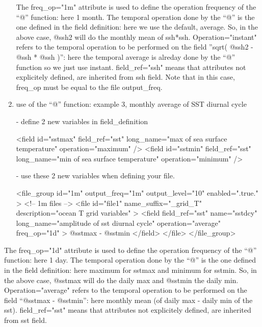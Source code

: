 \documentclass[../main/NEMO_manual]{subfiles}
\begin{document}
\begin{enumerate}
The freq\_op="1m" attribute is used to define the operation frequency of the ``@'' function: here 1 month.
The temporal operation done by the ``@'' is the one defined in the field definition:
here we use the default, average.
So, in the above case, @ssh2 will do the monthly mean of ssh*ssh.
Operation="instant" refers to the temporal operation to be performed on the field ''sqrt( @ssh2 - @ssh * @ssh )'':
here the temporal average is alreday done by the ``@'' function so we just use instant.
field\_ref="ssh" means that attributes not explicitely defined, are inherited from ssh field.
Note that in this case, freq\_op must be equal to the file output\_freq.

\item use of the ``@'' function: example 3, monthly average of SST diurnal cycle

 - define 2 new variables in field\_definition

\begin{xmllines}
   <field id="sstmax" field_ref="sst" long_name="max of sea surface temperature" operation="maximum" />
   <field id="sstmin" field_ref="sst" long_name="min of sea surface temperature" operation="minimum" />
\end{xmllines}

 - use these 2 new variables when defining your file.

\begin{xmllines}
<file_group id="1m" output_freq="1m"  output_level="10" enabled=".true." >  <!-- 1m files -->
   <file id="file1" name_suffix="_grid_T" description="ocean T grid variables" >
      <field field_ref="sst" name="sstdcy" long_name="amplitude of sst diurnal cycle" operation="average" freq_op="1d" >
                        @sstmax - @sstmin
      </field>
   </file>
</file_group>
\end{xmllines}

\end{enumerate}

The freq\_op="1d" attribute is used to define the operation frequency of the ``@'' function: here 1 day.
The temporal operation done by the ``@'' is the one defined in the field definition:
here maximum for sstmax and minimum for sstmin.
So, in the above case, @sstmax will do the daily max and @sstmin the daily min.
Operation="average" refers to the temporal operation to be performed on the field ``@sstmax - @sstmin'':
here monthly mean (of daily max - daily min of the sst).
field\_ref="sst" means that attributes not explicitely defined, are inherited from sst field.
\end{document}
